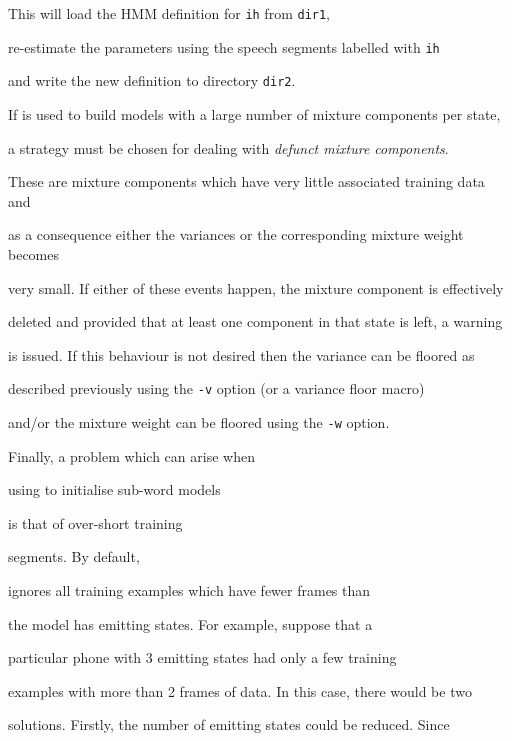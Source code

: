 This will load the HMM definition for \texttt{ih} from \texttt{dir1},


re-estimate the parameters using the speech segments labelled with \texttt{ih}


and write the new definition to directory \texttt{dir2}.





If  is used to build models with a large number of mixture components per state,


a strategy must be chosen for dealing with \textit{defunct mixture components}.


These are mixture components which have very little associated training data and


as a consequence either the variances or the corresponding mixture weight becomes


very small. If either of these events happen, the mixture component is effectively


deleted and provided that at least one component in that state is left, a warning


is issued.  If this behaviour is not desired then the variance can be floored as


described previously using the \texttt{-v} option (or a variance floor macro)


and/or the mixture weight can be floored using the \texttt{-w} option.  







Finally, a problem which can arise when


using   to initialise sub-word models 


is that of over-short training 


segments.  By default, 


 ignores all training examples which have fewer frames than


the model has emitting states.    For example, suppose that a 


particular phone with 3 emitting states had only a few training


examples with more than 2 frames of data.  In this case, there would be two


solutions.  Firstly, the number of emitting states could be reduced.  Since



